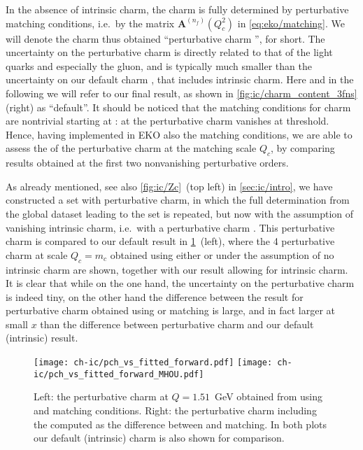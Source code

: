 
In the absence of intrinsic charm, the charm \pdf is fully determined by
perturbative matching conditions, i.e.\ by the matrix
$\mathbf{A}^{(n_f)}(Q_{c}^2)$ in \cref{eq:eko/matching}.
%
We will denote the
charm \pdf thus obtained
``perturbative charm \pdf'', for short. The \pdf
uncertainty on the perturbative charm \pdf is directly related to that 
of the light quarks and especially the gluon, and is typically much smaller
than  the  uncertainty on our default charm \pdf, that includes
intrinsic charm. Here and in the following we will refer to our final
result, as shown in \cref{fig:ic/charm_content_3fns} (right) as ``default''.
%
It should be noticed that the matching conditions for charm are 
nontrivial starting
at \nnlo: at \nlo the perturbative charm \pdf vanishes at threshold.
%
Hence, having implemented in EKO also the \nnnlo matching conditions,
we are able to assess the \mhou of the perturbative charm at the
matching scale $Q_c$, by comparing
results obtained at the first two nonvanishing perturbative
orders.

As already mentioned, see also \cref{fig:ic/Zc}~(top left) in
\cref{sec:ic/intro}, we have constructed a \pdf set with perturbative charm, in
which the full \pdf determination from the global dataset leading to the
 \pdf set is repeated, but now with the assumption of vanishing
intrinsic charm, i.e.\ with a perturbative charm \pdf.
%
This perturbative charm \pdf is compared to our default result
in \cref{fig:ic/charm_fitted_vs_perturbative_mhous}~(left), where the 4\fns
perturbative 
charm \pdf at scale  $Q_c=m_c$ obtained using either \nnlo or \nnnlo
under the assumption of no intrinsic charm are shown, together with
our  result allowing for intrinsic charm.
%
It is clear that while on the one hand, the \pdf uncertainty on the
perturbative charm \pdf is indeed tiny, on the other
hand the difference between the result for perturbative charm
obtained using \nnlo or \nnnlo matching is large, and in
fact larger at small $x$ than the difference between perturbative charm and our
default (intrinsic) result.

\begin{figure}[h]
  \begin{center}
    \texttt{[image: ch-ic/pch\_vs\_fitted\_forward.pdf]}
    \texttt{[image: ch-ic/pch\_vs\_fitted\_forward\_MHOU.pdf]}
    \caption{\small Left: the perturbative charm \pdf at $Q=1.51$~GeV
  obtained from \nnlo \pdfs using \nnlo and \nnnlo matching
    conditions.
      Right: the \nnlo perturbative charm \pdf including the \mhou
    computed as the difference between \nnlo and \nnnlo matching.
In both plots our default (intrinsic) charm \pdf is also shown for comparison.  
  \label{fig:ic/charm_fitted_vs_perturbative_mhous} }
\end{center}
\end{figure}

